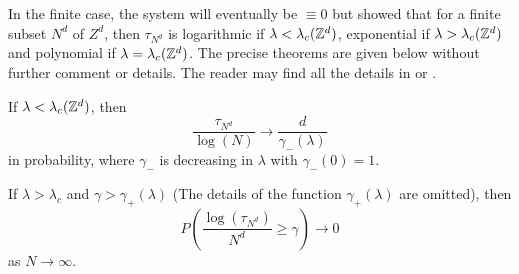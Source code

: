 In the finite case, the system will eventually be $\equiv 0$ but \cite{Liggett1999} showed that for a finite subset $N^d$ of $Z^d$, then $\tau_{N^d}$ is logarithmic if $\lambda < \lambda_c(\mathbb{Z}^d)$, exponential if $\lambda > \lambda_c(\mathbb{Z}^d)$ and polynomial if $\lambda = \lambda_c(\mathbb{Z}^d)$.
The precise theorems are given below without further comment or details.
The reader may find all the details in \cite{Liggett1999} or \cite{Liggett2002}.

\begin{theorem}\cite{Liggett1999}
If $\lambda < \lambda_c(\mathbb{Z}^d)$, then
$$
\frac{\tau_{N^d}}{\log(N)} \to \frac{d}{\gamma_{-}(\lambda)}
$$
in probability, where $\gamma_{-}$ is decreasing in $\lambda$ with $\gamma_{-}(0) = 1$.
\end{theorem}

\begin{theorem}\cite{Liggett1999}
If $\lambda > \lambda_c$ and $\gamma > \gamma_+(\lambda)$ (The details of the function $\gamma_+(\lambda)$ are omitted), then
$$
P\left(\frac{\log(\tau_{N^d})}{N^d} \geq \gamma \right) \to 0
$$
as $N \to \infty$.
\end{theorem}





